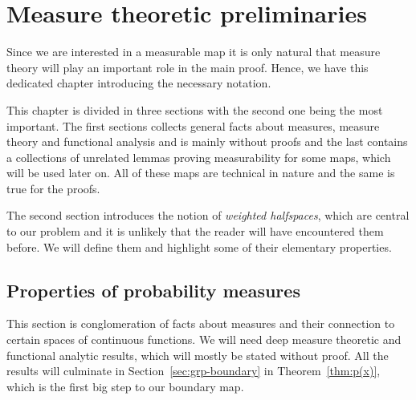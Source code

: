 \section{Measure theoretic preliminaries}
\label{sec:measure}

Since we are interested in a measurable map it is only natural that measure theory will play an important role in the main proof. Hence, we have this dedicated chapter introducing the necessary notation.

This chapter is divided in three sections with the second one being the most important. The first sections collects general facts about measures, measure theory and functional analysis and is mainly without proofs and the last contains a collections of unrelated lemmas proving measurability for some maps, which will be used later on. All of these maps are technical in nature and the same is true for the proofs.

The second section introduces the notion of \emph{weighted halfspaces}, which are central to our problem and it is unlikely that the reader will have encountered them before. We will define them and highlight some of their elementary properties.

\subsection{Properties of probability measures}
\label{sec:prob}

This section is conglomeration of facts about measures and their connection to certain spaces of continuous functions. We will need deep measure theoretic and functional analytic results, which will mostly be stated without proof. All the results will culminate in Section~\ref{sec:grp-boundary} in Theorem~\ref{thm:p(x)}, which is the first big step to our boundary map.

